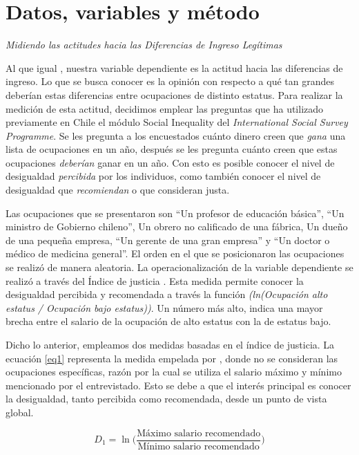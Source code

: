 \documentclass[12pt]{article}
\begin{document}
\newpage
\section*{Datos, variables y método}

\emph{Midiendo las actitudes hacia las Diferencias de Ingreso Legítimas}

Al que igual \cite{Trump2017}, nuestra variable dependiente es la actitud hacia las diferencias de ingreso. Lo que se busca conocer es la opinión con respecto a qué tan grandes deberían estas diferencias entre ocupaciones de distinto estatus. Para realizar la medición de esta actitud, decidimos emplear las preguntas que ha utilizado previamente en Chile el módulo Social Inequality del \emph{International Social Survey Programme}. Se les pregunta a los encuestados cuánto dinero creen que \emph{gana} una lista de ocupaciones en un año, después se les pregunta cuánto creen que estas ocupaciones \emph{deberían} ganar en un año. Con esto es posible conocer el nivel de desigualdad \emph{percibida} por los individuos, como también conocer el nivel de desigualdad que \emph{recomiendan} o que consideran justa.

Las ocupaciones que se presentaron son ``Un profesor de educación básica'', ``Un ministro de Gobierno chileno'', Un obrero no calificado de una fábrica, Un dueño de una pequeña empresa, ``Un gerente de una gran empresa'' y ``Un doctor o médico de medicina general''. El orden en el que se posicionaron las ocupaciones se realizó de manera aleatoria. La operacionalización de la variable dependiente se realizó a través del Índice de justicia \citep{Jasso1999}. Esta medida permite conocer la desigualdad percibida y recomendada a través la función \emph{(ln({Ocupación alto estatus / Ocupación bajo estatus}))}. Un número más alto, indica una mayor brecha entre el salario de la ocupación de alto estatus con la de estatus bajo. 

Dicho lo anterior, empleamos dos medidas basadas en el índice de justicia. La ecuación \ref{eq1} representa la medida empelada por \cite{Trump2017}, donde no se consideran las ocupaciones específicas, razón por la cual se utiliza el salario máximo y mínimo mencionado por el entrevistado. Esto se debe a que el interés principal es conocer la desigualdad, tanto percibida como recomendada, desde un punto de vista global.

\begin{equation}
\label{eq1}
D_1 = \ln\Bigg(\frac{\text{Máximo salario recomendado}}{\text{Mínimo salario recomendado}} \Bigg)
\end{equation}
\end{document}

